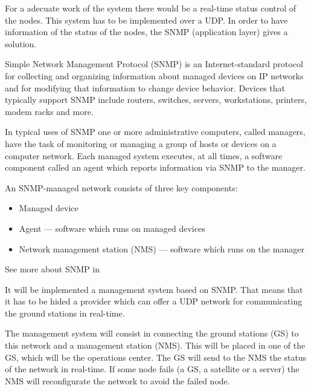 For a adecuate work of the system there would be a real-time status control of the nodes. This system has to be implemented over a UDP. In order to have information of the status of the nodes, the SNMP (application layer) gives a solution.

Simple Network Management Protocol (SNMP) is an Internet-standard protocol for collecting and organizing information about managed devices on IP networks and for modifying that information to change device behavior. Devices that typically support SNMP include routers, switches, servers, workstations, printers, modem racks and more.

In typical uses of SNMP one or more administrative computers, called managers, have the task of monitoring or managing a group of hosts or devices on a computer network. Each managed system executes, at all times, a software component called an agent which reports information via SNMP to the manager.

An SNMP-managed network consists of three key components:
\begin{itemize}
\item Managed device
\item Agent — software which runs on managed devices
\item Network management station (NMS) — software which runs on the manager
\end{itemize}

See more about SNMP in \cite{SNMP}

It will be implemented a management system based on SNMP. That means that it has to be hided a provider which can offer a UDP network for communicating the ground stations in real-time. 

The management system will consist in connecting the ground stations (GS) to this network and a management station (NMS). This will be placed in one of the GS, which will be the operations center. The GS will send to the NMS the status of the network in real-time. If some node fails (a GS, a satellite or a server) the NMS will reconfigurate the network to avoid the failed node. 